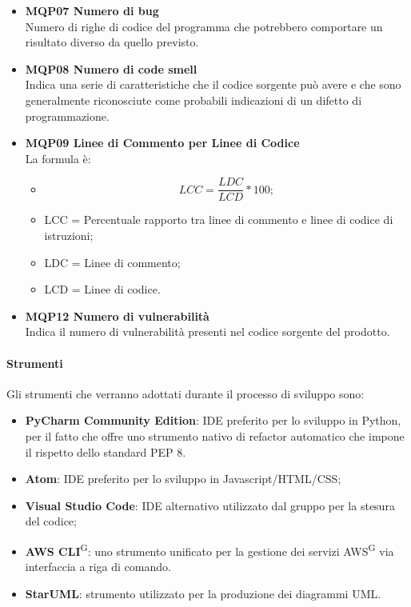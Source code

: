 \begin{itemize}
\item \textbf{MQP07 Numero di bug}\\
Numero di righe di codice del programma che potrebbero comportare un risultato diverso da quello previsto.

\item \textbf{MQP08 Numero di code smell}\\
Indica una serie di caratteristiche che il codice sorgente può avere e che sono generalmente riconosciute come probabili indicazioni di un difetto di programmazione.

\item \textbf{MQP09 Linee di Commento per Linee di Codice} \\
La formula è:
\begin{itemize}
  \item[] \[LCC = \frac{LDC}{LCD} * 100 ;\]
  \item LCC = Percentuale rapporto tra linee di commento e linee di codice di istruzioni;
  \item LDC = Linee di commento;
  \item LCD = Linee di codice.
  \end{itemize}


\item \textbf{MQP12 Numero di vulnerabilità}\\
Indica il numero di vulnerabilità presenti nel codice sorgente del prodotto.
\end{itemize}


\paragraph{Strumenti}
Gli strumenti che verranno adottati durante il processo di sviluppo sono:
\begin{itemize}
\item \textbf{PyCharm Community Edition}: IDE preferito per lo sviluppo in Python, per il fatto che offre uno strumento nativo di refactor automatico che impone il rispetto dello standard PEP 8.
\item \textbf{Atom}: IDE preferito per lo sviluppo in Javascript/HTML/CSS;
\item \textbf{Visual Studio Code}: IDE alternativo utilizzato dal gruppo per la stesura del codice;
\item \textbf{AWS CLI}\textsuperscript{G}: uno strumento unificato per la gestione dei servizi AWS\textsuperscript{G} via interfaccia a riga di comando.
\item \textbf{StarUML}: strumento utilizzato per la produzione dei diagrammi UML.

\end{itemize}
